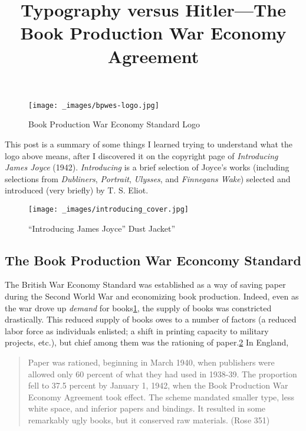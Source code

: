 \documentclass[
  12pt,
]{article}
\title{Typography versus Hitler---The Book Production War Economy
Agreement}
\author{}
\date{}
\begin{document}
\par\begin{figure}\centering\texttt{[image: \_images/bpwes-logo.jpg]}\caption{Book Production War Economy Standard Logo}\end{figure}

This post is a summary of some things I learned trying to understand
what the logo above means, after I discovered it on the copyright page
of \emph{Introducing James Joyce} (1942). \emph{Introducing} is a brief
selection of Joyce's works (including selections from \emph{Dubliners},
\emph{Portrait}, \emph{Ulysses}, and \emph{Finnegans Wake}) selected and
introduced (very briefly) by T. S. Eliot.

\par\begin{figure}\centering\texttt{[image: \_images/introducing\_cover.jpg]}\caption{“Introducing James Joyce” Dust Jacket”}\end{figure}

\hypertarget{the-book-production-war-econcomy-standard}{%
\subsection{The Book Production War Econcomy
Standard}\label{the-book-production-war-econcomy-standard}}

The British War Economy Standard was established as a way of saving
paper during the Second World War and economizing book production.
Indeed, even as the war drove up \emph{demand} for
books\protect\hyperlink{tvh-footnote1}{1}, the supply of books was
constricted drastically. This reduced supply of books owes to a number
of factors (a reduced labor force as individuals enlisted; a shift in
printing capacity to military projects, etc.), but chief among them was
the rationing of paper.\protect\hyperlink{tvh-footnote2}{2} In England,

\begin{quote}
Paper was rationed, beginning in March 1940, when publishers were
allowed only 60 percent of what they had used in 1938-39. The proportion
fell to 37.5 percent by January 1, 1942, when the Book Production War
Economy Agreement took effect. The scheme mandated smaller type, less
white space, and inferior papers and bindings. It resulted in some
remarkably ugly books, but it conserved raw materials. (Rose 351)
\end{quote}
\end{document}
